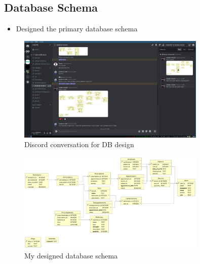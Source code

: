 \documentclass[a4paper,12pt]{article}
\begin{document}
\subsection{Database Schema}
\begin{itemize}
    \item Designed the primary database schema
\end{itemize}
\begin{figure}[H]
    \centering
    \includegraphics[width=0.8\textwidth]{images/discord_db.png}
    \caption{Discord conversation for DB design}
    \label{fig:discorddb}
\end{figure}
\begin{figure}[H]
    \centering
    \includegraphics[width=0.8\textwidth]{images/dbschema.jpg}
    \caption{My designed database schema}
    \label{fig:db}
\end{figure}
\end{document}
